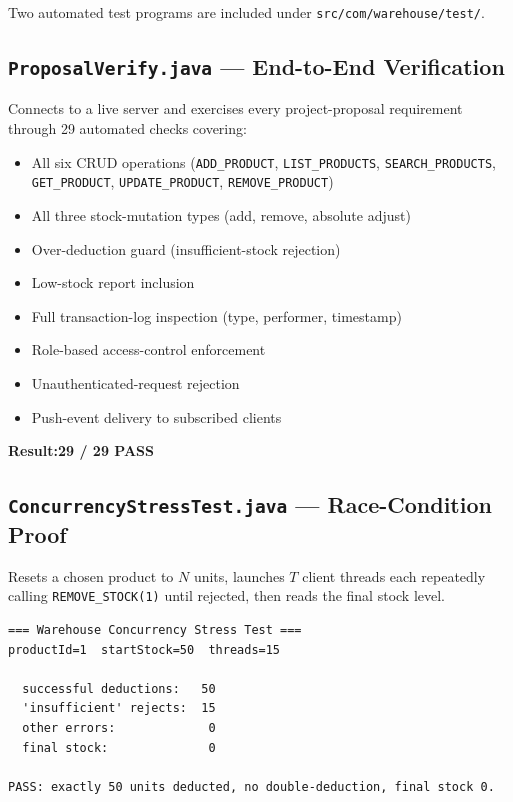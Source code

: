 \documentclass[12pt,a4paper]{article}
\begin{document}
Two automated test programs are included under \texttt{src/com/warehouse/test/}.

\subsection{\texttt{ProposalVerify.java} --- End-to-End Verification}

Connects to a live server and exercises every project-proposal requirement through
29 automated checks covering:

\begin{itemize}[leftmargin=1.4em]
  \item All six CRUD operations (\texttt{ADD\_PRODUCT}, \texttt{LIST\_PRODUCTS},
        \texttt{SEARCH\_PRODUCTS}, \texttt{GET\_PRODUCT}, \texttt{UPDATE\_PRODUCT},
        \texttt{REMOVE\_PRODUCT})
  \item All three stock-mutation types (add, remove, absolute adjust)
  \item Over-deduction guard (insufficient-stock rejection)
  \item Low-stock report inclusion
  \item Full transaction-log inspection (type, performer, timestamp)
  \item Role-based access-control enforcement
  \item Unauthenticated-request rejection
  \item Push-event delivery to subscribed clients
\end{itemize}

\begin{resultbox}
\textbf{Result:}\quad \textcolor{successgreen}{\textbf{29 / 29 PASS}}
\end{resultbox}

\subsection{\texttt{ConcurrencyStressTest.java} --- Race-Condition Proof}

Resets a chosen product to $N$ units, launches $T$ client threads each
repeatedly calling \texttt{REMOVE\_STOCK(1)} until rejected, then reads the
final stock level.

\begin{lstlisting}[style=shell, numbers=none,
  caption={Sample stress-test output ($N=50$, $T=15$)}]
=== Warehouse Concurrency Stress Test ===
productId=1  startStock=50  threads=15

  successful deductions:   50
  'insufficient' rejects:  15
  other errors:             0
  final stock:              0

PASS: exactly 50 units deducted, no double-deduction, final stock 0.
\end{lstlisting}
\end{document}
